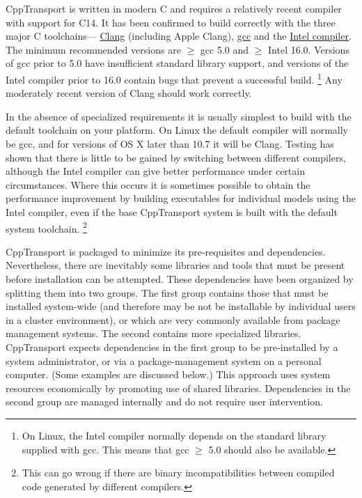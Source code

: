 \documentclass[11pt,a4paper]{article}
\newcommand{\packagefont}{\sffamily}
\newcommand{\CppTransport}{{\packagefont CppTransport}}
\newcommand{\semibold}[1]{{\fontseries{b}\selectfont{#1}}}
\newcommand{\para}[1]{\par\vspace{2mm}\noindent\semibold{{#1.}---}\ignorespaces}
\newcommand\CC{C\nolinebreak\hspace{-.05em}\raisebox{.4ex}{\relsize{-3}{\textbf{+}}}\nolinebreak\hspace{-.10em}\raisebox{.4ex}{\relsize{-3}{\textbf{+}}}}
\renewcommand{\geq}{\geqslant}
\begin{document}
\para{Compiler}
{\CppTransport} is written in modern {\CC} and requires a relatively recent compiler
with support for {\CC}14.
It has been confirmed to build
correctly with the three major {\CC} toolchains---%
\href{http://clang.llvm.org}{Clang}
(including Apple Clang),
\href{https://gcc.gnu.org}{gcc} and the
\href{https://software.intel.com/en-us/c-compilers}{Intel compiler}.
The minimum recommended versions
are $\geq$ gcc 5.0
and $\geq$ Intel 16.0.
Versions of gcc prior to 5.0 have insufficient standard library support,
and versions of the Intel compiler prior to 16.0
contain bugs that prevent a successful build.%
    \footnote{On Linux, the Intel compiler normally depends on the
    standard library supplied with gcc.
    This means that gcc $\geq$ 5.0 should also be available.}
Any moderately recent version of Clang should work correctly.

In the absence of specialized requirements
it is usually simplest to build with the default
toolchain on your platform.
On Linux the default compiler
will normally be gcc, and for versions of OS X later than 10.7
it will be Clang.
Testing has shown that there is little to be gained by switching between
different compilers, although the Intel compiler can give better performance
under certain circumstances.
Where this occurs
it is sometimes possible to obtain the performance improvement
by building executables for individual models using the Intel compiler,
even if the base {\CppTransport} system is built with the default system
toolchain.%
    \footnote{This can go wrong if there are binary incompatibilities
    between compiled code generated by different compilers.}

\para{Dependencies}
{\CppTransport} is packaged to minimize its pre-requisites and
dependencies.
Nevertheless, there are inevitably some libraries and tools that must be present
before installation can be attempted.
These dependencies have been organized by splitting them into two groups.
The
first
group contains those that must be installed system-wide
(and therefore may be not be installable by individual users in a cluster environment),
or which are very commonly available from package management systems.
The second contains more specialized libraries.
{\CppTransport}
expects dependencies in the first group to be pre-installed by a system
administrator,
or via a package-management system on a personal computer. (Some examples are discussed
below.)
This approach uses system resources economically by
promoting use of shared libraries. 
Dependencies in the second group are managed internally
and
do not require user intervention.
\end{document}
